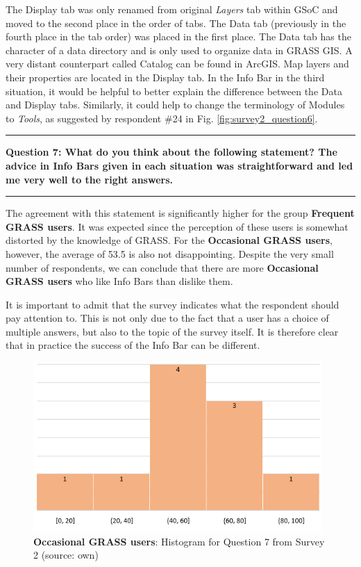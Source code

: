 \documentclass[a4paper,10pt,twoside]{article}
\begin{document}
\newpage
\noindent The Display tab was only renamed from original \textit{Layers} tab within GSoC and moved to the second place in the order of tabs. The Data tab (previously in the fourth place in the tab order) was placed in the first place. The Data tab has the character of a data directory and is only used to organize data in GRASS GIS. A very distant counterpart called Catalog can be found in ArcGIS. Map layers and their properties are located in the Display tab. In the Info Bar in the third situation, it would be helpful to better explain the difference between the Data and Display tabs. Similarly, it could help to change the terminology of Modules to \textit{Tools}, as suggested by respondent \#24 in Fig. \ref{fig:survey2_question6}.

\par\noindent\rule{\textwidth}{0.4pt}
\noindent \textbf{Question 7: What do you think about the following statement? The advice in Info Bars given in each situation was straightforward and led me very well to the right answers.}
\par\noindent\rule{\textwidth}{0.4pt}

\noindent The agreement with this statement is significantly higher for the group \textbf{Frequent GRASS users}. It was expected since the perception of these users is somewhat distorted by the knowledge of GRASS. For the \textbf{Occasional GRASS users}, however, the average of 53.5 is also not disappointing. Despite the very small number of respondents, we can conclude that there are more \textbf{Occasional GRASS users} who like Info Bars than dislike them. 

It is important to admit that the survey indicates what the respondent should pay attention to. This is not only due to the fact that a user has a choice of multiple answers, but also to the topic of the survey itself. It is therefore clear that in practice the success of the Info Bar can be different.

\vspace{0.3cm}
\begin{figure}[hbt!] 
\begin{center}
\includegraphics[width=11cm]{../surveys/analyzed_data/survey2_question7_histogram_group1.png} 
\caption[\textbf{Occasional GRASS users}: Histogram for Question 7 from Survey 2]{\textbf{Occasional GRASS users}: Histogram for Question 7 from Survey 2 (source: own)}
\label{fig:survey2_question7_histogram_group1}
\end{center}
\end{figure}
\end{document}
